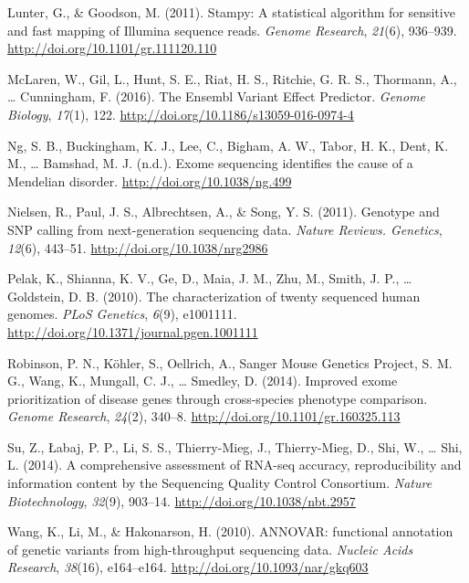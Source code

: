 \documentclass[12pt,twoside]{reedthesis}
\theoremstyle{definition}
\theoremstyle{definition}
\theoremstyle{remark}
\begin{document}
  \hypertarget{ref-Lunter2011}{}
  Lunter, G., \& Goodson, M. (2011). Stampy: A statistical algorithm for
  sensitive and fast mapping of Illumina sequence reads. \emph{Genome
  Research}, \emph{21}(6), 936--939.
  \url{http://doi.org/10.1101/gr.111120.110}
  
  \hypertarget{ref-McLaren2016}{}
  McLaren, W., Gil, L., Hunt, S. E., Riat, H. S., Ritchie, G. R. S.,
  Thormann, A., \ldots{} Cunningham, F. (2016). The Ensembl Variant Effect
  Predictor. \emph{Genome Biology}, \emph{17}(1), 122.
  \url{http://doi.org/10.1186/s13059-016-0974-4}
  
  \hypertarget{ref-Ng}{}
  Ng, S. B., Buckingham, K. J., Lee, C., Bigham, A. W., Tabor, H. K.,
  Dent, K. M., \ldots{} Bamshad, M. J. (n.d.). Exome sequencing identifies
  the cause of a Mendelian disorder. \url{http://doi.org/10.1038/ng.499}
  
  \hypertarget{ref-Nielsen2011}{}
  Nielsen, R., Paul, J. S., Albrechtsen, A., \& Song, Y. S. (2011).
  Genotype and SNP calling from next-generation sequencing data.
  \emph{Nature Reviews. Genetics}, \emph{12}(6), 443--51.
  \url{http://doi.org/10.1038/nrg2986}
  
  \hypertarget{ref-Pelak2010}{}
  Pelak, K., Shianna, K. V., Ge, D., Maia, J. M., Zhu, M., Smith, J. P.,
  \ldots{} Goldstein, D. B. (2010). The characterization of twenty
  sequenced human genomes. \emph{PLoS Genetics}, \emph{6}(9), e1001111.
  \url{http://doi.org/10.1371/journal.pgen.1001111}
  
  \hypertarget{ref-Robinson2014}{}
  Robinson, P. N., Köhler, S., Oellrich, A., Sanger Mouse Genetics
  Project, S. M. G., Wang, K., Mungall, C. J., \ldots{} Smedley, D.
  (2014). Improved exome prioritization of disease genes through
  cross-species phenotype comparison. \emph{Genome Research},
  \emph{24}(2), 340--8. \url{http://doi.org/10.1101/gr.160325.113}
  
  \hypertarget{ref-Su2014}{}
  Su, Z., Łabaj, P. P., Li, S. S., Thierry-Mieg, J., Thierry-Mieg, D.,
  Shi, W., \ldots{} Shi, L. (2014). A comprehensive assessment of RNA-seq
  accuracy, reproducibility and information content by the Sequencing
  Quality Control Consortium. \emph{Nature Biotechnology}, \emph{32}(9),
  903--14. \url{http://doi.org/10.1038/nbt.2957}
  
  \hypertarget{ref-Wang2010}{}
  Wang, K., Li, M., \& Hakonarson, H. (2010). ANNOVAR: functional
  annotation of genetic variants from high-throughput sequencing data.
  \emph{Nucleic Acids Research}, \emph{38}(16), e164--e164.
  \url{http://doi.org/10.1093/nar/gkq603}


\end{document}
